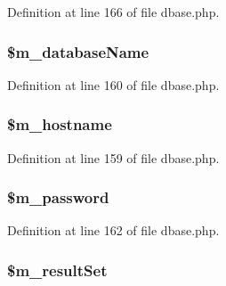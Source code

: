 Definition at line 166 of file dbase.\+php.

\hypertarget{class_c_dbase_ad0ba4c46852bb7d82bd04f9b51e97eea}{
\subsubsection[{\$m\+\_\+database\+Name}]{\setlength{\rightskip}{0pt plus 5cm}\$m\+\_\+database\+Name\hspace{0.3cm}{\ttfamily [private]}}}\label{class_c_dbase_ad0ba4c46852bb7d82bd04f9b51e97eea}


Definition at line 160 of file dbase.\+php.

\hypertarget{class_c_dbase_a18689448220cb9f67ee15999b4be473d}{
\subsubsection[{\$m\+\_\+hostname}]{\setlength{\rightskip}{0pt plus 5cm}\$m\+\_\+hostname\hspace{0.3cm}{\ttfamily [private]}}}\label{class_c_dbase_a18689448220cb9f67ee15999b4be473d}


Definition at line 159 of file dbase.\+php.

\hypertarget{class_c_dbase_a5ae64ed0082ea8180014069f702ad4b3}{
\subsubsection[{\$m\+\_\+password}]{\setlength{\rightskip}{0pt plus 5cm}\$m\+\_\+password\hspace{0.3cm}{\ttfamily [private]}}}\label{class_c_dbase_a5ae64ed0082ea8180014069f702ad4b3}


Definition at line 162 of file dbase.\+php.

\hypertarget{class_c_dbase_abe30b980bbd97a1d18b62f0d8dc13a7e}{
\subsubsection[{\$m\+\_\+result\+Set}]{\setlength{\rightskip}{0pt plus 5cm}\$m\+\_\+result\+Set\hspace{0.3cm}{\ttfamily [private]}}}\label{class_c_dbase_abe30b980bbd97a1d18b62f0d8dc13a7e}


